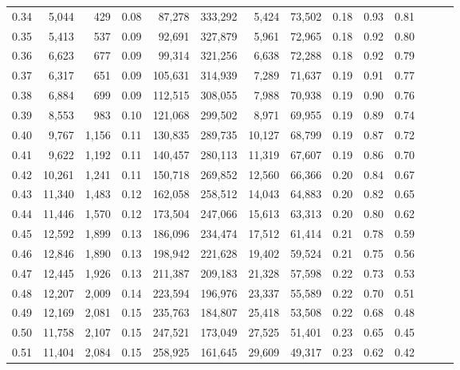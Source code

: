 \begin{tabular}{rrrrrrrrrrrrrr}
0.34 &   5,044 &    429 &  0.08 &   87,278 &  333,292 &   5,424 &  73,502 &  0.18 &  0.93 &      0.81 \\
0.35 &   5,413 &    537 &  0.09 &   92,691 &  327,879 &   5,961 &  72,965 &  0.18 &  0.92 &      0.80 \\
0.36 &   6,623 &    677 &  0.09 &   99,314 &  321,256 &   6,638 &  72,288 &  0.18 &  0.92 &      0.79 \\
0.37 &   6,317 &    651 &  0.09 &  105,631 &  314,939 &   7,289 &  71,637 &  0.19 &  0.91 &      0.77 \\
0.38 &   6,884 &    699 &  0.09 &  112,515 &  308,055 &   7,988 &  70,938 &  0.19 &  0.90 &      0.76 \\
0.39 &   8,553 &    983 &  0.10 &  121,068 &  299,502 &   8,971 &  69,955 &  0.19 &  0.89 &      0.74 \\
0.40 &   9,767 &  1,156 &  0.11 &  130,835 &  289,735 &  10,127 &  68,799 &  0.19 &  0.87 &      0.72 \\
0.41 &   9,622 &  1,192 &  0.11 &  140,457 &  280,113 &  11,319 &  67,607 &  0.19 &  0.86 &      0.70 \\
0.42 &  10,261 &  1,241 &  0.11 &  150,718 &  269,852 &  12,560 &  66,366 &  0.20 &  0.84 &      0.67 \\
0.43 &  11,340 &  1,483 &  0.12 &  162,058 &  258,512 &  14,043 &  64,883 &  0.20 &  0.82 &      0.65 \\
0.44 &  11,446 &  1,570 &  0.12 &  173,504 &  247,066 &  15,613 &  63,313 &  0.20 &  0.80 &      0.62 \\
0.45 &  12,592 &  1,899 &  0.13 &  186,096 &  234,474 &  17,512 &  61,414 &  0.21 &  0.78 &      0.59 \\
0.46 &  12,846 &  1,890 &  0.13 &  198,942 &  221,628 &  19,402 &  59,524 &  0.21 &  0.75 &      0.56 \\
0.47 &  12,445 &  1,926 &  0.13 &  211,387 &  209,183 &  21,328 &  57,598 &  0.22 &  0.73 &      0.53 \\
0.48 &  12,207 &  2,009 &  0.14 &  223,594 &  196,976 &  23,337 &  55,589 &  0.22 &  0.70 &      0.51 \\
0.49 &  12,169 &  2,081 &  0.15 &  235,763 &  184,807 &  25,418 &  53,508 &  0.22 &  0.68 &      0.48 \\
0.50 &  11,758 &  2,107 &  0.15 &  247,521 &  173,049 &  27,525 &  51,401 &  0.23 &  0.65 &      0.45 \\
0.51 &  11,404 &  2,084 &  0.15 &  258,925 &  161,645 &  29,609 &  49,317 &  0.23 &  0.62 &      0.42 \\

\end{tabular}
